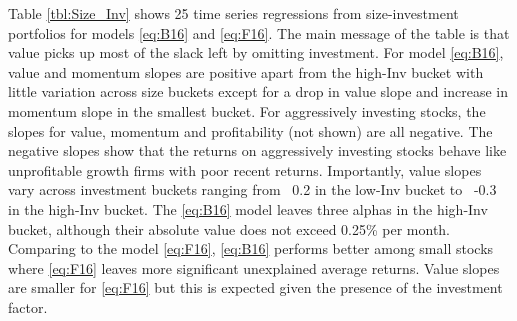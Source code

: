 
Table \ref{tbl:Size_Inv} shows 25 time series regressions from size-investment
portfolios for models \ref{eq:B16} and \ref{eq:F16}.
The main message of the table is that value picks up most of the slack left by
omitting investment.
For model \ref{eq:B16},
value and momentum slopes are positive apart from the high-Inv bucket
with little variation across size buckets except for a drop in value slope and
increase in momentum slope in the smallest bucket.
For aggressively investing stocks, the slopes for value, momentum and
profitability (not shown) are all negative.
The negative slopes show that the returns on aggressively investing stocks
behave like unprofitable growth firms with poor recent returns.
Importantly, value slopes vary across investment buckets ranging from ~0.2 in
the low-Inv bucket to ~-0.3 in the high-Inv bucket.
The \ref{eq:B16} model leaves three alphas in the high-Inv bucket,
although their absolute value does not exceed 0.25\% per month.
Comparing to the model \ref{eq:F16},
\ref{eq:B16} performs better among small stocks where \ref{eq:F16}
leaves more significant unexplained average returns.
Value slopes are smaller for \ref{eq:F16} but this is expected given the
presence of the investment factor.

